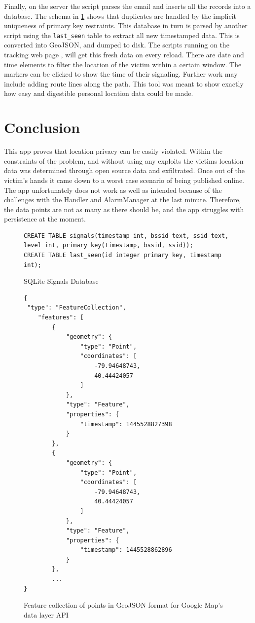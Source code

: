 \documentclass[conference,compsoc]{IEEEtran}
\begin{document}
Finally, on the server the script parses the email and inserts all the records into a database. The schema in \ref{fig:StromOnResult} shows that duplicates are handled by the implicit uniqueness of primary key restraints. This database in turn is parsed by another script using the \texttt{last\_seen} table to extract all new timestamped data. This is converted into GeoJSON, and dumped to disk. The scripts running on the tracking web page \cite{Tracking}, will get this fresh data on every reload. There are date and time elements to filter the location of the victim within a certain window. The markers can be clicked to show the time of their signaling. Further work may include adding route lines along the path. This tool was meant to show exactly how easy and digestible personal location data could be made.

\section{Conclusion}
This app proves that location privacy can be easily violated. Within the constraints of the problem, and without using any exploits the victims location data was determined through open source data and exfiltrated. Once out of the victim's hands it came down to a worst case scenario of being published online. The app unfortunately does not work as well as intended because of the challenges with the Handler and AlarmManager at the last minute. Therefore, the data points are not as many as there should be, and the app struggles with persistence at the moment.

\begin{figure}
  \begin{lstlisting}
CREATE TABLE signals(timestamp int, bssid text, ssid text, level int, primary key(timestamp, bssid, ssid));
CREATE TABLE last_seen(id integer primary key, timestamp int);
  \end{lstlisting}
  \caption{SQLite Signals Database}
  \label{fig:StromOnResult}
\end{figure}


\begin{figure}
\begin{lstlisting}
{
 "type": "FeatureCollection",
    "features": [
        {
            "geometry": {
                "type": "Point",
                "coordinates": [
                    -79.94648743,
                    40.44424057
                ]
            },
            "type": "Feature",
            "properties": {
                "timestamp": 1445528827398
            }
        },
        {
            "geometry": {
                "type": "Point",
                "coordinates": [
                    -79.94648743,
                    40.44424057
                ]
            },
            "type": "Feature",
            "properties": {
                "timestamp": 1445528862896
            }
        },
        ...
}
\end{lstlisting}
\caption{Feature collection of points in GeoJSON format for Google Map's data layer API}
\label{geojson}
\end{figure}
\end{document}
